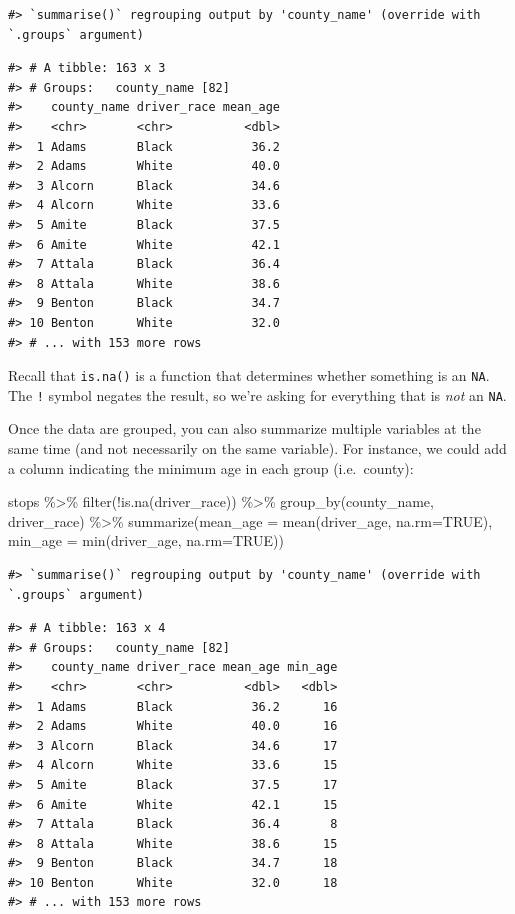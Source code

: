 \documentclass[
]{book}
\newenvironment{Shaded}{\begin{snugshade}}{\end{snugshade}}
\newcommand{\AttributeTok}[1]{\textcolor[rgb]{0.77,0.63,0.00}{#1}}
\newcommand{\ConstantTok}[1]{\textcolor[rgb]{0.00,0.00,0.00}{#1}}
\newcommand{\FunctionTok}[1]{\textcolor[rgb]{0.00,0.00,0.00}{#1}}
\newcommand{\NormalTok}[1]{#1}
\newcommand{\SpecialCharTok}[1]{\textcolor[rgb]{0.00,0.00,0.00}{#1}}
\begin{document}
\begin{verbatim}
#> `summarise()` regrouping output by 'county_name' (override with `.groups` argument)
\end{verbatim}

\begin{verbatim}
#> # A tibble: 163 x 3
#> # Groups:   county_name [82]
#>    county_name driver_race mean_age
#>    <chr>       <chr>          <dbl>
#>  1 Adams       Black           36.2
#>  2 Adams       White           40.0
#>  3 Alcorn      Black           34.6
#>  4 Alcorn      White           33.6
#>  5 Amite       Black           37.5
#>  6 Amite       White           42.1
#>  7 Attala      Black           36.4
#>  8 Attala      White           38.6
#>  9 Benton      Black           34.7
#> 10 Benton      White           32.0
#> # ... with 153 more rows
\end{verbatim}

Recall that \texttt{is.na()} is a function that determines whether something is an \texttt{NA}. The \texttt{!} symbol negates the result, so we're asking for everything that is \emph{not} an \texttt{NA}.

Once the data are grouped, you can also summarize multiple variables at the same
time (and not necessarily on the same variable). For instance, we could add a
column indicating the minimum age in each group (i.e.~county):

\begin{Shaded}
\begin{Highlighting}[]
\NormalTok{stops }\SpecialCharTok{\%\textgreater{}\%}
  \FunctionTok{filter}\NormalTok{(}\SpecialCharTok{!}\FunctionTok{is.na}\NormalTok{(driver\_race)) }\SpecialCharTok{\%\textgreater{}\%} 
  \FunctionTok{group\_by}\NormalTok{(county\_name, driver\_race) }\SpecialCharTok{\%\textgreater{}\%}
  \FunctionTok{summarize}\NormalTok{(}\AttributeTok{mean\_age =} \FunctionTok{mean}\NormalTok{(driver\_age, }\AttributeTok{na.rm=}\ConstantTok{TRUE}\NormalTok{),}
            \AttributeTok{min\_age =} \FunctionTok{min}\NormalTok{(driver\_age, }\AttributeTok{na.rm=}\ConstantTok{TRUE}\NormalTok{))}
\end{Highlighting}
\end{Shaded}

\begin{verbatim}
#> `summarise()` regrouping output by 'county_name' (override with `.groups` argument)
\end{verbatim}

\begin{verbatim}
#> # A tibble: 163 x 4
#> # Groups:   county_name [82]
#>    county_name driver_race mean_age min_age
#>    <chr>       <chr>          <dbl>   <dbl>
#>  1 Adams       Black           36.2      16
#>  2 Adams       White           40.0      16
#>  3 Alcorn      Black           34.6      17
#>  4 Alcorn      White           33.6      15
#>  5 Amite       Black           37.5      17
#>  6 Amite       White           42.1      15
#>  7 Attala      Black           36.4       8
#>  8 Attala      White           38.6      15
#>  9 Benton      Black           34.7      18
#> 10 Benton      White           32.0      18
#> # ... with 153 more rows
\end{verbatim}
\end{document}
